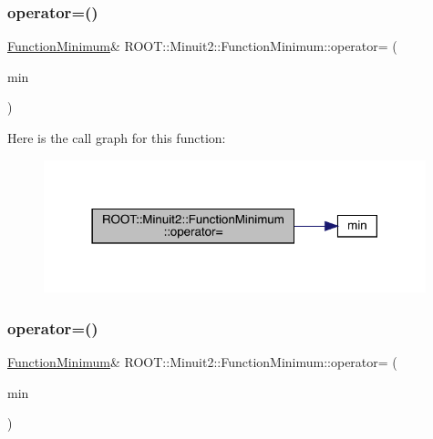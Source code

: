 \subsubsection{\texorpdfstring{operator=()}{operator=()}\hspace{0.1cm}{\footnotesize\ttfamily [2/3]}}
{\footnotesize\ttfamily \mbox{\hyperlink{classROOT_1_1Minuit2_1_1FunctionMinimum}{Function\+Minimum}}\& R\+O\+O\+T\+::\+Minuit2\+::\+Function\+Minimum\+::operator= (\begin{DoxyParamCaption}\item[{const \mbox{\hyperlink{classROOT_1_1Minuit2_1_1FunctionMinimum}{Function\+Minimum}} \&}]{min }\end{DoxyParamCaption})\hspace{0.3cm}{\ttfamily [inline]}}

Here is the call graph for this function\+:
\nopagebreak
\begin{figure}[H]
\begin{center}
\leavevmode
\includegraphics[width=314pt]{d4/dfb/classROOT_1_1Minuit2_1_1FunctionMinimum_a107909f1a994436795eb310f951f14cb_cgraph}
\end{center}
\end{figure}
\mbox{\label{classROOT_1_1Minuit2_1_1FunctionMinimum_a107909f1a994436795eb310f951f14cb}} 
\subsubsection{\texorpdfstring{operator=()}{operator=()}\hspace{0.1cm}{\footnotesize\ttfamily [3/3]}}
{\footnotesize\ttfamily \mbox{\hyperlink{classROOT_1_1Minuit2_1_1FunctionMinimum}{Function\+Minimum}}\& R\+O\+O\+T\+::\+Minuit2\+::\+Function\+Minimum\+::operator= (\begin{DoxyParamCaption}\item[{const \mbox{\hyperlink{classROOT_1_1Minuit2_1_1FunctionMinimum}{Function\+Minimum}} \&}]{min }\end{DoxyParamCaption})\hspace{0.3cm}{\ttfamily [inline]}}

